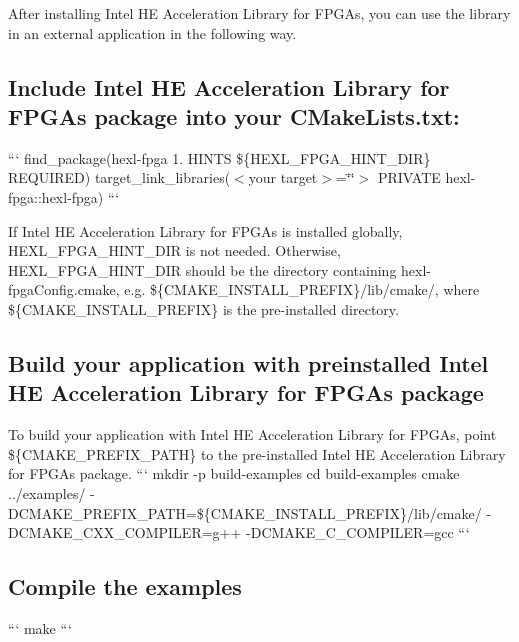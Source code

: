 After installing Intel H\-E Acceleration Library for F\-P\-G\-As, you can use the library in an external application in the following way.

\subsection*{Include Intel H\-E Acceleration Library for F\-P\-G\-As package into your {\ttfamily C\-Make\-Lists.\-txt}\-:}

``` find\-\_\-package(hexl-\/fpga 1. H\-I\-N\-T\-S \$\{H\-E\-X\-L\-\_\-\-F\-P\-G\-A\-\_\-\-H\-I\-N\-T\-\_\-\-D\-I\-R\} R\-E\-Q\-U\-I\-R\-E\-D) target\-\_\-link\-\_\-libraries($<$your target$>$=\char`\"{}\char`\"{}$>$ P\-R\-I\-V\-A\-T\-E hexl-\/fpga\-::hexl-\/fpga) ```

If Intel H\-E Acceleration Library for F\-P\-G\-As is installed globally, {\ttfamily H\-E\-X\-L\-\_\-\-F\-P\-G\-A\-\_\-\-H\-I\-N\-T\-\_\-\-D\-I\-R} is not needed. Otherwise, {\ttfamily H\-E\-X\-L\-\_\-\-F\-P\-G\-A\-\_\-\-H\-I\-N\-T\-\_\-\-D\-I\-R} should be the directory containing {\ttfamily hexl-\/fpga\-Config.\-cmake}, e.\-g. {\ttfamily \$\{C\-M\-A\-K\-E\-\_\-\-I\-N\-S\-T\-A\-L\-L\-\_\-\-P\-R\-E\-F\-I\-X\}/lib/cmake/}, where \$\{C\-M\-A\-K\-E\-\_\-\-I\-N\-S\-T\-A\-L\-L\-\_\-\-P\-R\-E\-F\-I\-X\} is the pre-\/installed directory.

\subsection*{Build your application with preinstalled Intel H\-E Acceleration Library for F\-P\-G\-As package}

To build your application with Intel H\-E Acceleration Library for F\-P\-G\-As, point \$\{C\-M\-A\-K\-E\-\_\-\-P\-R\-E\-F\-I\-X\-\_\-\-P\-A\-T\-H\} to the pre-\/installed Intel H\-E Acceleration Library for F\-P\-G\-As package. ``` mkdir -\/p build-\/examples cd build-\/examples cmake ../examples/ -\/\-D\-C\-M\-A\-K\-E\-\_\-\-P\-R\-E\-F\-I\-X\-\_\-\-P\-A\-T\-H=\$\{C\-M\-A\-K\-E\-\_\-\-I\-N\-S\-T\-A\-L\-L\-\_\-\-P\-R\-E\-F\-I\-X\}/lib/cmake/ -\/\-D\-C\-M\-A\-K\-E\-\_\-\-C\-X\-X\-\_\-\-C\-O\-M\-P\-I\-L\-E\-R=g++ -\/\-D\-C\-M\-A\-K\-E\-\_\-\-C\-\_\-\-C\-O\-M\-P\-I\-L\-E\-R=gcc ```

\subsection*{Compile the examples}

``` make ```

